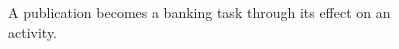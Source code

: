 \begin{figure}[H]
\centering
{}
\caption{A publication becomes a banking task through its effect on an activity.}\label{fig:teach-P-01-problem-00}
\end{figure}
